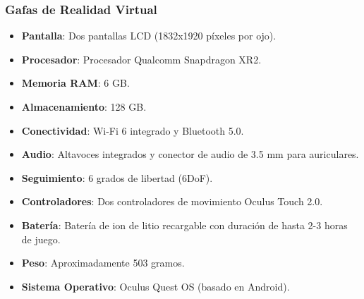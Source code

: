 \subsubsection{Gafas de Realidad Virtual}
\begin{itemize}
    \item \textbf{Pantalla}: Dos pantallas LCD (1832x1920 píxeles por ojo).
    \item \textbf{Procesador}: Procesador Qualcomm Snapdragon XR2.
    \item \textbf{Memoria RAM}: 6 GB.
    \item \textbf{Almacenamiento}: 128 GB.
    \item \textbf{Conectividad}: Wi-Fi 6 integrado y Bluetooth 5.0.
    \item \textbf{Audio}: Altavoces integrados y conector de audio de 3.5 mm para auriculares.
    \item \textbf{Seguimiento}: 6 grados de libertad (6DoF).
    \item \textbf{Controladores}: Dos controladores de movimiento Oculus Touch 2.0.
    \item \textbf{Batería}: Batería de ion de litio recargable con duración de hasta 2-3 horas de juego.
    \item \textbf{Peso}: Aproximadamente 503 gramos.
    \item \textbf{Sistema Operativo}: Oculus Quest OS (basado en Android).
\end{itemize}


